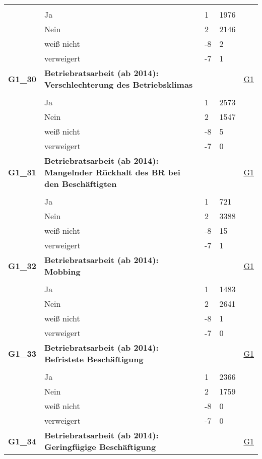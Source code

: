 \begin{longtable}{| L{2.5cm} | L{8.25cm}| C{1.5cm} | R{1.25cm} | C{2.25cm} |  }
   &  &  &  &  \\ 
   & Ja & 1 & 1976 &  \\ 
   & Nein & 2 & 2146 &  \\ 
   & weiß nicht & -8 & 2 &  \\ 
   & verweigert & -7 & 1 &  \\ 
   \midrule
\textbf{G1\_30}\label{var:suf:G1:30} & \textbf{Betriebratsarbeit (ab 2014): Verschlechterung des Betriebsklimas} &  &  & \hyperref[G1]{G1} \\ 
   &  &  &  &  \\ 
   & Ja & 1 & 2573 &  \\ 
   & Nein & 2 & 1547 &  \\ 
   & weiß nicht & -8 & 5 &  \\ 
   & verweigert & -7 & 0 &  \\ 
   \midrule
\textbf{G1\_31}\label{var:suf:G1:31} & \textbf{Betriebratsarbeit (ab 2014): Mangelnder Rückhalt des BR bei den Beschäftigten} &  &  & \hyperref[G1]{G1} \\ 
   &  &  &  &  \\ 
   & Ja & 1 & 721 &  \\ 
   & Nein & 2 & 3388 &  \\ 
   & weiß nicht & -8 & 15 &  \\ 
   & verweigert & -7 & 1 &  \\ 
   \midrule
\textbf{G1\_32}\label{var:suf:G1:32} & \textbf{Betriebratsarbeit (ab 2014): Mobbing} &  &  & \hyperref[G1]{G1} \\ 
   &  &  &  &  \\ 
   & Ja & 1 & 1483 &  \\ 
   & Nein & 2 & 2641 &  \\ 
   & weiß nicht & -8 & 1 &  \\ 
   & verweigert & -7 & 0 &  \\ 
   \midrule
\textbf{G1\_33}\label{var:suf:G1:33} & \textbf{Betriebratsarbeit (ab 2014): Befristete Beschäftigung} &  &  & \hyperref[G1]{G1} \\ 
   &  &  &  &  \\ 
   & Ja & 1 & 2366 &  \\ 
   & Nein & 2 & 1759 &  \\ 
   & weiß nicht & -8 & 0 &  \\ 
   & verweigert & -7 & 0 &  \\ 
   \midrule
\textbf{G1\_34}\label{var:suf:G1:34} & \textbf{Betriebratsarbeit (ab 2014): Geringfügige Beschäftigung} &  &  & \hyperref[G1]{G1} \\ 

\end{longtable}
